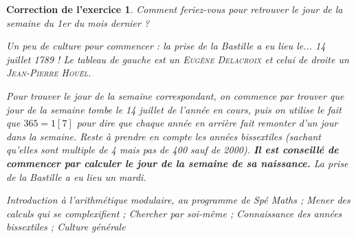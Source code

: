 \documentclass[12pt]{article}
\theoremstyle{break}
\newtheorem{cor}{Correction de l'exercice}
\begin{document}
\begin{cor}
\textit{Comment feriez-vous pour retrouver le jour de la semaine du 1er du mois dernier ?}

Un peu de culture pour commencer : la prise de la Bastille a eu lieu le... 14 juillet 1789 ! Le tableau de gauche est un \textsc{Eugène Delacroix} et celui de droite un \textsc{Jean-Pierre Houël}.\newline

Pour trouver le jour de la semaine correspondant, on commence par trouver que jour de la semaine tombe le 14 juillet de l'année en cours, puis on utilise le fait que $365 = 1 [7]$ pour dire que chaque année en arrière fait remonter d'un jour dans la semaine. Reste à prendre en compte les années bissextiles (sachant qu'elles sont multiple de 4 mais pas de 400 sauf de 2000). \textbf{Il est conseillé de commencer par calculer le jour de la semaine de sa naissance.} La prise de la Bastille a eu lieu un mardi.\newline \newline

\textit{Introduction à l'arithmétique modulaire, au programme de Spé Maths ; Mener des calculs qui se complexifient ; Chercher par soi-même ; Connaissance des années bissextiles ; Culture générale}
\end{cor}
\end{document}
